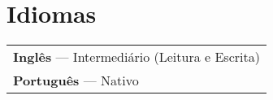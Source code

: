 \documentclass[a4paper,12pt]{article}
\begin{document}
\section{Idiomas}
\begin{tabularx}{\linewidth}{@{}X@{}}
\textbf{Inglês} — Intermediário (Leitura e Escrita) \\
\textbf{Português} — Nativo \\
\end{tabularx}

\vfill
{}
\end{document}
